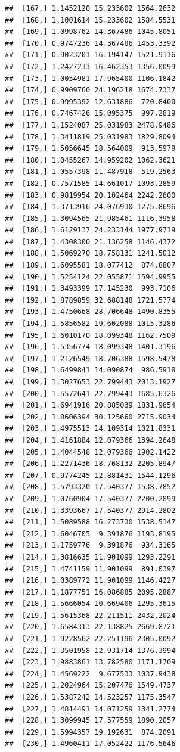 \documentclass[article]{jss}\usepackage[]{graphicx}\usepackage[]{xcolor}
\makeatletter
\newenvironment{kframe}{%
 \def\at@end@of@kframe{}%
 \ifinner\ifhmode%
  \def\at@end@of@kframe{\end{minipage}}%
  \begin{minipage}{\columnwidth}%
 \fi\fi%
 \def\FrameCommand##1{\hskip\@totalleftmargin \hskip-\fboxsep
 \colorbox{shadecolor}{##1}\hskip-\fboxsep
     \hskip-\linewidth \hskip-\@totalleftmargin \hskip\columnwidth}%
 \MakeFramed {\advance\hsize-\width
   \@totalleftmargin\z@ \linewidth\hsize
   \@setminipage}}%
 {\par\unskip\endMakeFramed%
 \at@end@of@kframe}
\newenvironment{knitrout}{}{} %
\makeatother
\begin{document}
\begin{knitrout}
\begin{kframe}
\begin{verbatim}
##  [167,] 1.1452120 15.233602 1564.2632
##  [168,] 1.1001614 15.233602 1584.5531
##  [169,] 1.0998762 14.367486 1045.8051
##  [170,] 0.9747236 14.367486 1453.3392
##  [171,] 0.9023201 16.194147 1521.9116
##  [172,] 1.2427233 16.462353 1356.0099
##  [173,] 1.0054981 17.965400 1106.1842
##  [174,] 0.9909760 24.196218 1674.7337
##  [175,] 0.9995392 12.631886  720.8400
##  [176,] 0.7467426 15.095375  997.2819
##  [177,] 1.1524087 25.031983 2478.9486
##  [178,] 1.3411819 25.031983 1829.8094
##  [179,] 1.5056645 18.564009  913.5979
##  [180,] 1.0455267 14.959202 1062.3621
##  [181,] 1.0557398 11.487918  519.2563
##  [182,] 0.7571585 14.661017 1093.2859
##  [183,] 0.9819954 20.102464 2242.2600
##  [184,] 1.3713916 24.076930 1275.8696
##  [185,] 1.3094565 21.985461 1116.3958
##  [186,] 1.6129137 24.233144 1977.9719
##  [187,] 1.4308300 21.136258 1146.4372
##  [188,] 1.5069270 18.758131 1241.5012
##  [189,] 1.6095581 18.077412  874.8807
##  [190,] 1.5254124 22.055871 1594.9955
##  [191,] 1.3493399 17.145230  993.7106
##  [192,] 1.8789859 32.688148 1721.5774
##  [193,] 1.4750668 28.706648 1490.8355
##  [194,] 1.5856582 19.602088 1015.3286
##  [195,] 1.6010170 18.099348 1162.7509
##  [196,] 1.5356774 18.099348 1401.3196
##  [197,] 1.2126549 18.706388 1598.5478
##  [198,] 1.6499841 14.090874  986.5918
##  [199,] 1.3027653 22.799443 2013.1927
##  [200,] 1.5572641 22.799443 1685.6326
##  [201,] 1.6941916 20.885039 1831.9654
##  [202,] 1.8606394 30.125660 2715.9034
##  [203,] 1.4975513 14.109314 1021.8331
##  [204,] 1.4161884 12.079366 1394.2648
##  [205,] 1.4044548 12.079366 1902.1422
##  [206,] 1.2271436 18.768132 2205.8947
##  [207,] 0.9774245 12.881431 1544.1296
##  [208,] 1.5793320 17.540377 1538.7852
##  [209,] 1.0760904 17.540377 2200.2899
##  [210,] 1.3393667 17.540377 2914.2802
##  [211,] 1.5089588 16.273730 1538.5147
##  [212,] 1.6046705  9.391876 1193.8195
##  [213,] 1.1759776  9.391876  934.3165
##  [214,] 1.3816635 11.901099 1293.2291
##  [215,] 1.4741159 11.901099  891.0397
##  [216,] 1.0389772 11.901099 1146.4227
##  [217,] 1.1877751 16.086885 2095.2887
##  [218,] 1.5666054 10.669406 1295.3615
##  [219,] 1.5615368 22.211511 2432.2024
##  [220,] 1.6584313 22.138825 2669.8721
##  [221,] 1.9228562 22.251196 2305.0092
##  [222,] 1.3501958 12.931714 1376.3994
##  [223,] 1.9883861 13.782580 1171.1709
##  [224,] 1.4569222  9.677533 1037.9438
##  [225,] 1.2024964 15.207476 1549.4737
##  [226,] 1.5387242 14.523257 1175.3547
##  [227,] 1.4814491 14.071259 1341.2774
##  [228,] 1.3099945 17.577559 1890.2057
##  [229,] 1.5994357 19.192631  874.2091
##  [230,] 1.4960411 17.052422 1176.5646

\end{verbatim}
\end{kframe}
\end{knitrout}
\end{document}
